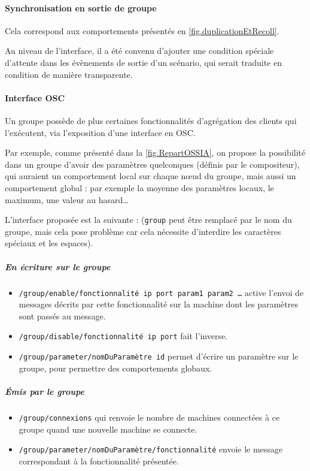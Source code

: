 \paragraph{Synchronisation en sortie de groupe}
Cela correspond aux comportements présentés en \cref{fig.duplicationEtRecoll}.

Au niveau de l'interface, il a été convenu d'ajouter une condition spéciale d'attente dans les évènements de sortie d'un scénario, qui serait traduite en condition  de manière transparente.

\paragraph{Interface OSC}
Un groupe possède de plus certaines fonctionnalités d'agrégation des clients qui l'exécutent, via l'exposition d'une interface en \ac{OSC}.

Par exemple, comme présenté dans la \cref{fig.RepartOSSIA}, on propose la possibilité dans un groupe d'avoir des paramètres quelconques (définis par le compositeur), qui auraient un comportement local sur chaque nœud du groupe, mais aussi un comportement global : par exemple la moyenne des paramètres locaux, le maximum, une valeur au hasard\dots

L'interface proposée est la suivante : (\texttt{group} peut être remplacé par le nom du groupe, mais cela pose problème car cela nécessite d'interdire les caractères spéciaux et les espaces).

\subparagraph{En écriture sur le groupe} 
\begin{itemize}
	\item \texttt{/group/enable/fonctionnalité ip port param1 param2 \dots} active l'envoi de messages décrits par cette fonctionnalité sur la machine dont les paramètres sont passés au message.
	\item \texttt{/group/disable/fonctionnalité ip port} fait l'inverse.
	\item \texttt{/group/parameter/nomDuParamètre id} permet d'écrire un paramètre sur le groupe, pour permettre des comportements globaux.
\end{itemize}

\subparagraph{Émis par le groupe}
\begin{itemize}
	\item \texttt{/group/connexions} qui renvoie le nombre de machines connectées à ce groupe quand une nouvelle machine se connecte.
	\item \texttt{/group/parameter/nomDuParamètre/fonctionnalité} envoie le message correspondant à la fonctionnalité présentée.
\end{itemize}

